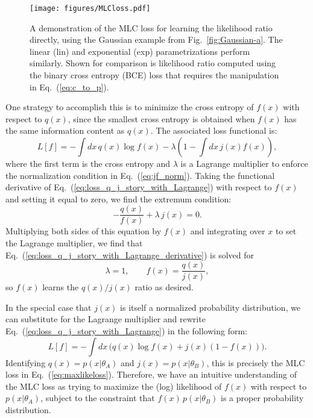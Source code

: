 \documentclass[aps,prx,reprint,preprintnumbers,superscriptaddress,nofootinbib,longbibliography,floatfix]{revtex4-2}
\newcommand{\thetaup}{\theta_A}
\newcommand{\thetadown}{\theta_B}
\DeclareRobustCommand{\Fig}[1]{Fig.~\ref{fig:#1}}
\DeclareRobustCommand{\Eq}[1]{Eq.~(\ref{eq:#1})}
\begin{document}
 \begin{figure}[t]
 \centering
 \texttt{[image: figures/MLCloss.pdf]}
 \caption{ 
 A demonstration of the MLC loss for learning the likelihood ratio directly, using the Gaussian example from \Fig{Gaussian-a}.
 The linear (lin) and exponential (exp) parametrizations perform similarly. 
 Shown for comparison is likelihood ratio
 computed using the binary cross entropy (BCE) loss that requires the manipulation in \Eq{c_to_p}.}
 \label{fig:MLC}
 \end{figure}


One strategy to accomplish this is to minimize the cross entropy of $f(x)$ with respect to $q(x)$, since the smallest cross entropy is obtained when $f(x)$ has the same information content as $q(x)$.
%
The associated loss functional is:
%
\begin{equation}
\label{eq:loss_q_j_story_with_Lagrange}
L[f] = - \int dx \, q(x) \log f(x) - \lambda \left(1 - \int dx \, j(x) f(x) \right),
\end{equation}
%
where the first term is the cross entropy and $\lambda$ is a Lagrange multiplier to enforce the normalization condition in \Eq{jf_norm}.
%
Taking the functional derivative of \Eq{loss_q_j_story_with_Lagrange} with respect to $f(x)$ and setting it equal to zero, we find the extremum condition:
%
\begin{equation}
\label{eq:loss_q_j_story_with_Lagrange_derivative}
- \frac{q(x)}{f(x)} + \lambda \, j(x) = 0.
\end{equation}
%
Multiplying both sides of this equation by $f(x)$ and integrating over $x$ to set the Lagrange multiplier, we find that \Eq{loss_q_j_story_with_Lagrange_derivative} is solved for
%
\begin{equation}
\lambda = 1, \qquad f(x) = \frac{q(x)}{j(x)},
\end{equation}
%
so $f(x)$ learns the $q(x)/j(x)$ ratio as desired.


In the special case that $j(x)$ is itself a normalized probability distribution, we can substitute for the Lagrange multiplier and rewrite \Eq{loss_q_j_story_with_Lagrange} in the following form:
%
\begin{equation}
\label{eq:loss_q_j_story_without_Lagrange}
L[f] = - \int dx \, \Big( q(x) \log f(x) + j(x) (1 -f(x)) \Big).
\end{equation}
%
Identifying $q(x) = p(x|\thetaup)$ and $j(x) = p(x|\thetadown)$, this is precisely the MLC loss in \Eq{maxlikeloss}.
%
Therefore, we have an intuitive understanding of the MLC loss as trying to maximize the (log) likelihood of $f(x)$ with respect to $p(x|\thetaup)$, subject to the constraint that $f(x) \, p(x|\thetadown)$ is a proper probability distribution.
\end{document}

